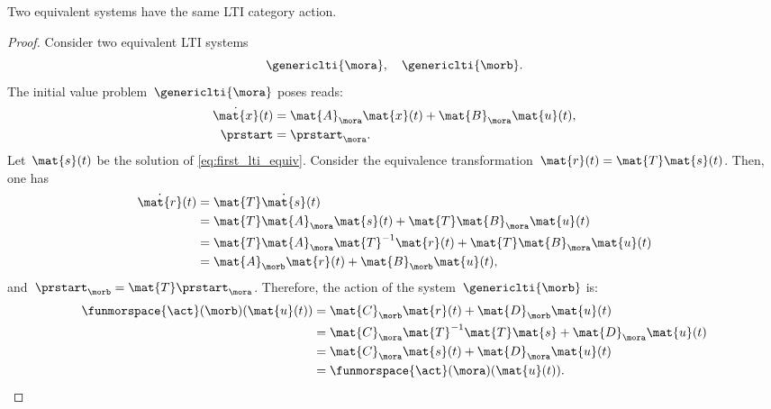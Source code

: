 \begin{lemma}
    \label{lem:equivsystequivact}
    Two equivalent systems have the same LTI category action.
\end{lemma}
\begin{proof}
    Consider two equivalent LTI systems
    \begin{equation*}
        \genericlti{\mora},\quad \genericlti{\morb}.
    \end{equation*}
    The initial value problem~$\genericlti{\mora}$ poses reads:
    \begin{equation}
        \label{eq:first_lti_equiv}
        \begin{aligned}
            \dot{\mat{x}}(t) & =\mat{A}_{\mora}\mat{x}(t)+\mat{B}_{\mora}\mat{u}(t), \\
            \prstart         & = \prstart_\mora.
        \end{aligned}
    \end{equation}
    Let~$\mat{s}(t)$ be the solution of \cref{eq:first_lti_equiv}.
    Consider the equivalence transformation~$\mat{r}(t)\linebreak[0]=\mat{T}\mat{s}(t)$.
    Then, one has
    \begin{equation*}
        \begin{aligned}
            \dot{\mat{r}}(t) & =\mat{T}\dot{\mat{s}}(t) \\
                             & =\mat{T}\mat{A}_\mora \mat{s}(t)+\mat{T}\mat{B}_\mora \mat{u}(t) \\
                             & =\mat{T}\mat{A}_\mora \mat{T}^{-1}\mat{r}(t)+\mat{T}\mat{B}_\mora \mat{u}(t) \\
                             & =\mat{A}_\morb\mat{r}(t)+\mat{B}_\morb \mat{u}(t),
        \end{aligned}
    \end{equation*}
    and~$ \prstart_\morb=\mat{T} \prstart_\mora$.
    Therefore, the action of the system~$\genericlti{\morb}$ is:
    \begin{equation*}
        \begin{aligned}
            \funmorspace{\act}(\morb)(\mat{u}(t)) & =\mat{C}_\morb \mat{r}(t)+ \mat{D}_\morb \mat{u}(t) \\
                                                  & =\mat{C}_\mora \mat{T}^{-1}\mat{T}\mat{s}+\mat{D}_\mora \mat{u}(t) \\
                                                  & =\mat{C}_\mora \mat{s}(t)+\mat{D}_\mora \mat{u}(t) \\
                                                  & =\funmorspace{\act}(\mora)(\mat{u}(t)).
        \end{aligned}
    \end{equation*}
\end{proof}

